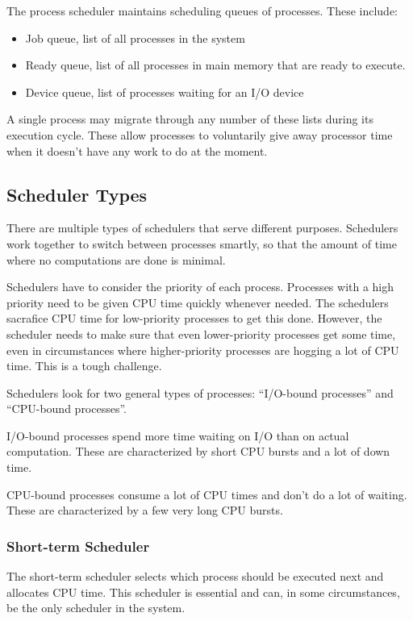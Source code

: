 \documentclass{article}
\begin{document}
The process scheduler maintains scheduling queues of processes. These include:

\begin{itemize}
	\item Job queue, list of all processes in the system
	\item Ready queue, list of all processes in main memory that are
		ready to execute.
	\item Device queue, list of processes waiting for an I/O device
\end{itemize}

A single process may migrate through any number of these lists during its
execution cycle. These allow processes to voluntarily give away processor
time when it doesn't have any work to do at the moment.

\subsection{Scheduler Types}
There are multiple types of schedulers that serve different purposes.
Schedulers work together to switch between processes smartly, so that the
amount of time where no computations are done is minimal.

Schedulers have to consider the priority of each process. Processes with a high
priority need to be given CPU time quickly whenever needed. The schedulers
sacrafice CPU time for low-priority processes to get this done. However, the
scheduler needs to make sure that even lower-priority processes get some time,
even in circumstances where higher-priority processes are hogging a lot of CPU
time. This is a tough challenge.
 
Schedulers look for two general types of processes: ``I/O-bound processes'' and
``CPU-bound processes''.

I/O-bound processes spend more time waiting on I/O
than on actual computation. These are characterized by short CPU bursts and a
lot of down time.

CPU-bound processes consume a lot of CPU times and don't do a lot of waiting.
These are characterized by a few very long CPU bursts.

\subsubsection{Short-term Scheduler}
The short-term scheduler selects which process should be executed next and
allocates CPU time. This scheduler is essential and can, in some circumstances,
be the only scheduler in the system.
\end{document}
